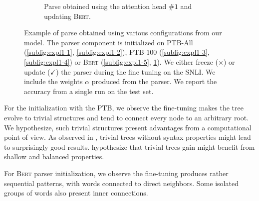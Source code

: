 \begin{figure}[htb!]
\begin{subfigure}[b]{0.475\textwidth}
        \caption{Parse obtained using the attention head \#$1$ and updating \textsc{Bert}.}
        \label{subfig:expl1-6}
    \end{subfigure}
    \caption{Example of parse obtained using various configurations from our model. The parser component is initialized on PTB-All (\ref{subfig:expl1-1}, \ref{subfig:expl1-2}), PTB-100 (\ref{subfig:expl1-3}, \ref{subfig:expl1-4}) or \textsc{Bert} (\ref{subfig:expl1-5}, \ref{subfig:expl1-6}). We either freeze ($\times$) or update ($\checkmark$) the parser during the fine tuning on the SNLI. We include the weights $\alpha$ produced from the parser. 
    We report the accuracy from a single run on the test set.} 
    \label{fig:parse-expl}
\end{figure}

For the initialization with the PTB, we observe the fine-tuning makes the tree evolve to trivial structures and tend to connect every node to an arbitrary root. We hypothesize, such trivial structures present advantages from a computational point of view. As observed in \textcite{shi_18}, trivial trees without syntax properties might lead to surprisingly good results. \textcite{shi_18} hypothesize that trivial trees gain might benefit from shallow and balanced properties.

For \textsc{Bert} parser initialization, we observe the fine-tuning produces rather sequential patterns, with words connected to direct neighbors. Some isolated groups of words also present inner connections.






